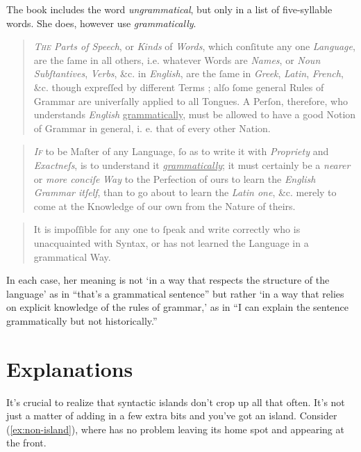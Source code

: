 The book includes the word \textit{ungrammatical}, but only in a list of five-syllable words. She does, however use \textit{grammatically}.

\begin{quote}
    \textit{T\textsc{he} Parts of Speech}, or \textit{Kinds} of \textit{Words}, which conſitute any one \textit{Language}, are the ſame in all others, i.e. whatever Words are \textit{Names}, or \textit{Noun Subſtantives}, \textit{Verbs}, \&c. in \textit{English}, are the ſame in \textit{Greek}, \textit{Latin}, \textit{French}, \&c. though expreſſed by different Terms ; alſo ſome general Rules of Grammar are univerſally applied to all Tongues. A Perſon, therefore, who understands \textit{English} \uline{grammatically}, must be allowed to have a good Notion of Grammar in general, i. e. that of every other Nation.\hfill \citep[iv]{Fisher1785}
\end{quote}

\begin{quote}
    \textit{I\textsc{f}} to be Maſter of any Language, ſo as to write it with \textit{Propriety} and \textit{Exactneſs}, is to understand it \textit{\uline{grammatically}}; it must certainly be a \textit{nearer} or \textit{more conciſe} \textit{Way} to the Perfection of ours to learn the \textit{English Grammar itſelf}, than to go about to learn the \textit{Latin one}, \&c. merely to come at the Knowledge of our own from the Nature of theirs.\hfill \citep[vii]{Fisher1785}
\end{quote}

\begin{quote}
    It is impoſſible for any one to ſpeak and write correctly who is unacquainted with Syntax, or has not learned the Language in a grammatical Way.\hfill\citep[xii]{Fisher1785}
\end{quote}

In each case, her meaning is not `in a way that respects the structure of the language' as in ``that's a grammatical sentence'' but rather `in a way that relies on explicit knowledge of the rules of grammar,' as in ``I can explain the sentence grammatically but not historically.''

\section{Explanations}

It's crucial to realize that syntactic islands don't crop up all that often. It's not just a matter of adding in a few extra bits and you've got an island. Consider (\ref{ex:non-island}), where  has no problem leaving its home spot and appearing at the front.

